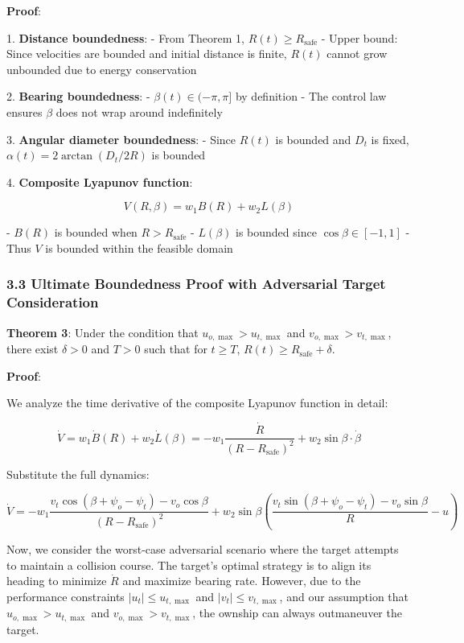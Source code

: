 \documentclass[11pt,a4paper]{article}
\numberwithin{equation}{section}
\begin{document}
\textbf{Proof}:

1. \textbf{Distance boundedness}:
   - From Theorem 1, $R(t) \geq R_{\text{safe}}$
   - Upper bound: Since velocities are bounded and initial distance is finite, $R(t)$ cannot grow unbounded due to energy conservation

2. \textbf{Bearing boundedness}:
   - $\beta(t) \in (-\pi, \pi]$ by definition
   - The control law ensures $\beta$ does not wrap around indefinitely

3. \textbf{Angular diameter boundedness}:
   - Since $R(t)$ is bounded and $D_t$ is fixed, $\alpha(t) = 2\arctan(D_t/2R)$ is bounded

4. \textbf{Composite Lyapunov function}:

\[
V(R, \beta) = w_1 B(R) + w_2 L(\beta)
\]

   - $B(R)$ is bounded when $R > R_{\text{safe}}$
   - $L(\beta)$ is bounded since $\cos\beta \in [-1, 1]$
   - Thus $V$ is bounded within the feasible domain

\subsubsection{3.3 Ultimate Boundedness Proof with Adversarial Target Consideration}

\textbf{Theorem 3}: Under the condition that $u_{o,\max} > u_{t,\max}$ and $v_{o,\max} > v_{t,\max}$, there exist $\delta > 0$ and $T > 0$ such that for $t \geq T$, $R(t) \geq R_{\text{safe}} + \delta$.

\textbf{Proof}:

We analyze the time derivative of the composite Lyapunov function in detail:

\[
\dot{V} = w_1 \dot{B}(R) + w_2 \dot{L}(\beta) = -w_1 \frac{\dot{R}}{(R-R_{\text{safe}})^2} + w_2 \sin\beta \cdot \dot{\beta}
\]

Substitute the full dynamics:

\[
\dot{V} = -w_1 \frac{v_t\cos(\beta + \psi_o - \psi_t) - v_o\cos\beta}{(R-R_{\text{safe}})^2} + w_2 \sin\beta \left( \frac{v_t\sin(\beta + \psi_o - \psi_t) - v_o\sin\beta}{R} - u \right)
\]

Now, we consider the worst-case adversarial scenario where the target attempts to maintain a collision course. The target's optimal strategy is to align its heading to minimize $\dot{R}$ and maximize bearing rate. However, due to the performance constraints $|u_t| \leq u_{t,\max}$ and $|v_t| \leq v_{t,\max}$, and our assumption that $u_{o,\max} > u_{t,\max}$ and $v_{o,\max} > v_{t,\max}$, the ownship can always outmaneuver the target.
\end{document}
